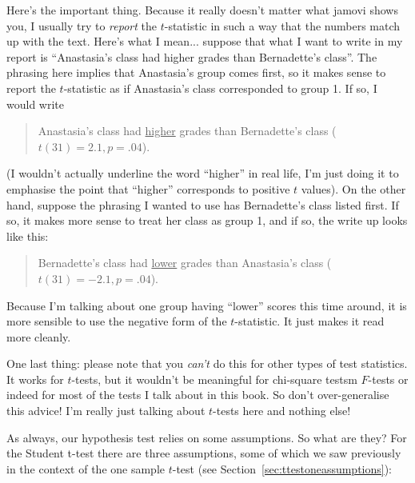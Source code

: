 Here's the important thing. Because it really doesn't matter what jamovi shows you, I usually try to {\it report} the $t$-statistic in such a way that the numbers match up with the text. Here's what I mean... suppose that what I want to write in my report is ``Anastasia's class had higher  grades than Bernadette's class''. The phrasing here implies that Anastasia's group comes first, so it makes sense to report the $t$-statistic as if Anastasia's class corresponded to group 1. If so, I would write 
\begin{quote}
Anastasia's class had \underline{higher} grades than Bernadette's class ($t(31)= 2.1, p=.04$). 
\end{quote}
(I wouldn't actually underline the word ``higher'' in real life, I'm just doing it to emphasise the point that ``higher'' corresponds to positive $t$ values). On the other hand, suppose the phrasing I wanted to use has Bernadette's class listed first. If so, it makes more sense to treat her class as group 1, and if so, the write up looks like this:
\begin{quote}
Bernadette's class had \underline{lower} grades than Anastasia's class ($t(31)= -2.1, p=.04$). 
\end{quote}
Because I'm talking about one group having ``lower'' scores this time around, it is more sensible to use the negative form of the $t$-statistic. It just makes it read more cleanly.

One last thing: please note that you {\it can't} do this for other types of test statistics. It works for $t$-tests, but it wouldn't be meaningful for  chi-square testsm $F$-tests or indeed for most of the tests I talk about in this book. So don't over-generalise this advice! I'm really just talking about $t$-tests here and nothing else!
 
 

As always, our hypothesis test relies on some assumptions. So what are they? For the Student t-test there are three assumptions, some of which we saw previously in the context of the one sample $t$-test (see Section~\ref{sec:ttestoneassumptions}):

